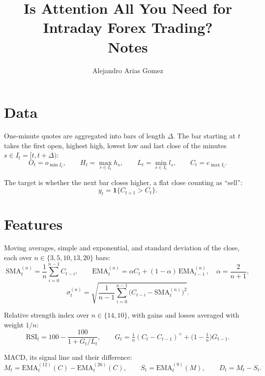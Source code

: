 \documentclass[11pt]{article}
\title{Is Attention All You Need for Intraday Forex Trading?\\
  \large Notes}
\author{Alejandro Arias Gomez}
\date{}
\begin{document}
\maketitle

\section{Data}

One-minute quotes are aggregated into bars of length $\Delta$. The bar
starting at $t$ takes the first open, highest high, lowest low and last
close of the minutes $s \in I_t = [t, t + \Delta)$:
\begin{equation}
  O_t = o_{\min I_t}, \qquad
  H_t = \max_{s \in I_t} h_s, \qquad
  L_t = \min_{s \in I_t} l_s, \qquad
  C_t = c_{\max I_t}.
\end{equation}

The target is whether the next bar closes higher, a flat close counting
as ``sell'':
\begin{equation}
  y_t = \mathbf{1}\{C_{t+1} > C_t\}.
\end{equation}

\section{Features}

Moving averages, simple and exponential, and standard deviation of the
close, each over $n \in \{3, 5, 10, 13, 20\}$ bars:
\begin{equation}
  \mathrm{SMA}_t^{(n)} = \frac{1}{n} \sum_{i=0}^{n-1} C_{t-i}, \qquad
  \mathrm{EMA}_t^{(n)} = \alpha C_t + (1 - \alpha)\, \mathrm{EMA}_{t-1}^{(n)},
  \quad \alpha = \frac{2}{n + 1},
\end{equation}
\begin{equation}
  \sigma_t^{(n)} = \sqrt{\frac{1}{n - 1} \sum_{i=0}^{n-1}
    \bigl(C_{t-i} - \mathrm{SMA}_t^{(n)}\bigr)^2}.
\end{equation}

Relative strength index over $n \in \{14, 10\}$, with gains and losses
averaged with weight $1/n$:
\begin{equation}
  \mathrm{RSI}_t = 100 - \frac{100}{1 + G_t / L_t}, \qquad
  G_t = \tfrac{1}{n} (C_t - C_{t-1})^+ + \bigl(1 - \tfrac{1}{n}\bigr)
    G_{t-1}.
\end{equation}

MACD, its signal line and their difference:
\begin{equation}
  M_t = \mathrm{EMA}_t^{(12)}(C) - \mathrm{EMA}_t^{(26)}(C), \qquad
  S_t = \mathrm{EMA}_t^{(9)}(M), \qquad
  D_t = M_t - S_t.
\end{equation}
\end{document}
